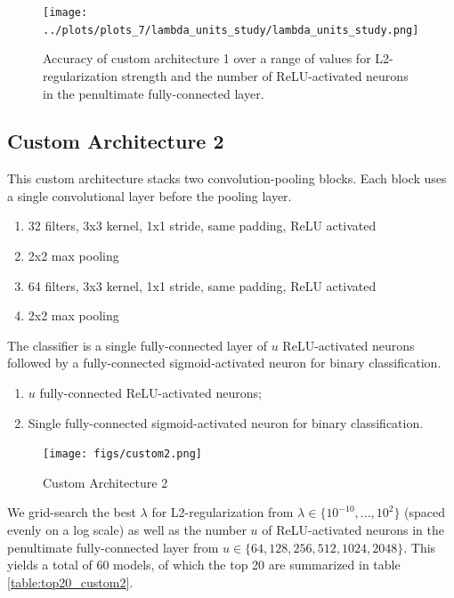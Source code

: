 \begin{figure}[ht]
    \centering
    \texttt{[image: ../plots/plots\_7/lambda\_units\_study/lambda\_units\_study.png]}
    \caption{Accuracy of custom architecture 1 over a range of values for L2-regularization strength and the number of ReLU-activated neurons in the penultimate fully-connected layer.}
    \label{fig:lambda_units_study_custom1}
\end{figure}












\subsection{Custom Architecture 2}

This custom architecture stacks two convolution-pooling blocks. Each block uses a single convolutional layer before the pooling layer.

\begin{enumerate}
    \item 32 filters, 3x3 kernel, 1x1 stride, same padding, ReLU activated
    \item 2x2 max pooling
    \item 64 filters, 3x3 kernel, 1x1 stride, same padding, ReLU activated
    \item 2x2 max pooling
\end{enumerate}

The classifier is a single fully-connected layer of $u$ ReLU-activated neurons followed by a fully-connected sigmoid-activated neuron for binary classification.

\begin{enumerate}
    \item $u$ fully-connected ReLU-activated neurons;
    \item Single fully-connected sigmoid-activated neuron for binary classification.
\end{enumerate}


\begin{figure}[ht]
    \centering
    \texttt{[image: figs/custom2.png]}
    \caption{Custom Architecture 2}
    \label{fig:custom2}
\end{figure}

We grid-search the best $\lambda$ for L2-regularization from $\lambda \in \{10^{-10}, ..., 10^{2}\}$ (spaced evenly on a log scale) as well as the number $u$ of ReLU-activated neurons in the penultimate fully-connected layer from $u \in \{ 64, 128, 256, 512, 1024, 2048 \}$. This yields a total of $60$ models, of which the top 20 are summarized in table \ref{table:top20_custom2}.

